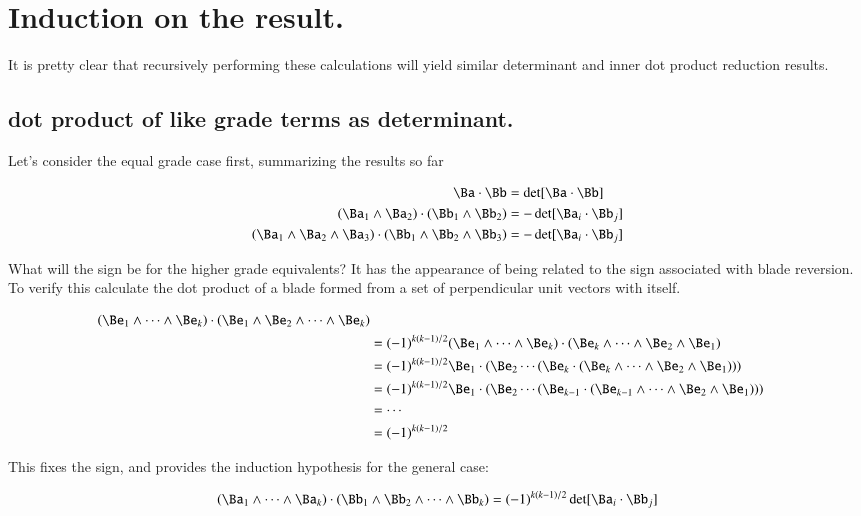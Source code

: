 \section{Induction on the result. }

It is pretty clear that recursively performing these calculations will yield similar determinant and inner dot product reduction
results.

\subsection{dot product of like grade terms as determinant. }

Let's consider the equal grade case first, summarizing the results so far

\begin{align*}
\Ba \cdot \Bb &= \det[\Ba \cdot \Bb] \\
(\Ba_1 \wedge \Ba_2) \cdot (\Bb_1 \wedge \Bb_2) &= -\det[\Ba_i \cdot \Bb_j] \\
(\Ba_1 \wedge \Ba_2 \wedge \Ba_3) \cdot (\Bb_1 \wedge \Bb_2 \wedge \Bb_3) &= -\det[\Ba_i \cdot \Bb_j] \\
\end{align*}

What will the sign be for the higher grade equivalents?  It has the appearance of being related to the sign associated with blade
reversion.  To verify this calculate the dot product of a blade formed from a set of perpendicular unit vectors with itself.

\begin{align*}
(\Be_1 \wedge \cdots \wedge \Be_k) \cdot (\Be_1 \wedge \Be_2 \wedge \cdots \wedge \Be_k) \\
&= (-1)^{k(k-1)/2}(\Be_1 \wedge \cdots \wedge \Be_k) \cdot (\Be_k \wedge \cdots \wedge \Be_2 \wedge \Be_1) \\
&= (-1)^{k(k-1)/2}\Be_1 \cdot (\Be_2 \cdots (\Be_k \cdot (\Be_k \wedge \cdots \wedge \Be_2 \wedge \Be_1))) \\
&= (-1)^{k(k-1)/2}\Be_1 \cdot (\Be_2 \cdots (\Be_{k-1} \cdot (\Be_{k-1} \wedge \cdots \wedge \Be_2 \wedge \Be_1))) \\
&= \cdots \\
&= (-1)^{k(k-1)/2}
\end{align*}

This fixes the sign, and provides the induction hypothesis for the general case:

\begin{equation}\label{eqn:bladegradereduction:bladedothyp}
(\Ba_1 \wedge \cdots \wedge \Ba_k) \cdot (\Bb_1 \wedge \Bb_2 \wedge \cdots \wedge \Bb_k) = (-1)^{k(k-1)/2}\det[\Ba_i \cdot \Bb_j]
\end{equation}

